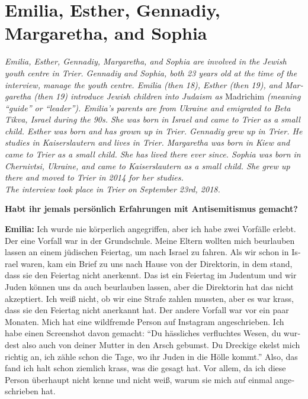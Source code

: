 \section{Emilia, Esther, Gennadiy, Margaretha, and Sophia}
\begin{otherlanguage}{ngerman}
\textit{Emilia, Esther, Gennadiy, Margaretha, and Sophia are involved in the Jewish youth centre in Trier. Gennadiy and Sophia, both 23 years old at the time of the interview, manage the youth centre. Emilia (then 18), Esther (then 19), and Margaretha (then 19) introduce Jewish children into Judaism as} Madrichim \textit{(meaning ``guide'' or ``leader''). Emilia’s parents are from Ukraine and emigrated to Beta Tikva, Israel during the 90s. She was born in Israel and came to Trier as a small child. Esther was born and has grown up in Trier. Gennadiy grew up in Trier. He studies in Kaiserslautern and lives in Trier. Margaretha was born in Kiew and came to Trier as a small child. She has lived there ever since. Sophia was born in Chernivtsi, Ukraine, and came to Kaiserslautern as a small child. She grew up there and moved to Trier in 2014 for her studies.\\
The interview took place in Trier on September 23rd, 2018.}\par   
\vspace*{2em}
\textbf{Habt ihr jemals persönlich Erfahrungen mit Antisemitismus gemacht?} 

\textbf{Emilia:} Ich wurde nie körperlich angegriffen, aber ich habe zwei Vorfälle erlebt. Der eine Vorfall war in der Grundschule. Meine Eltern wollten mich beurlauben lassen an einem jüdischen Feiertag, um nach Israel zu fahren. Als wir schon in Israel waren, kam ein Brief zu uns nach Hause von der Direktorin, in dem stand, dass sie den Feiertag nicht anerkennt. Das ist ein Feiertag im Judentum und wir Juden können uns da auch beurlauben lassen, aber die Direktorin hat das nicht akzeptiert. Ich weiß nicht, ob wir eine Strafe zahlen mussten, aber es war krass, dass sie den Feiertag nicht anerkannt hat. Der andere Vorfall war vor ein paar Monaten. Mich hat eine wildfremde Person auf Instagram angeschrieben. Ich habe einen Screenshot davon gemacht: "`Du hässliches verfluchtes Wesen, du wurdest also auch von deiner Mutter in den Arsch gebumst. Du Dreckige ekelst mich richtig an, ich zähle schon die Tage, wo ihr Juden in die Hölle kommt."' Also, das fand ich halt schon ziemlich krass, was die gesagt hat.  Vor allem, da ich diese Person überhaupt nicht kenne und nicht weiß, warum sie mich auf einmal angeschrieben hat. 


\end{otherlanguage}
